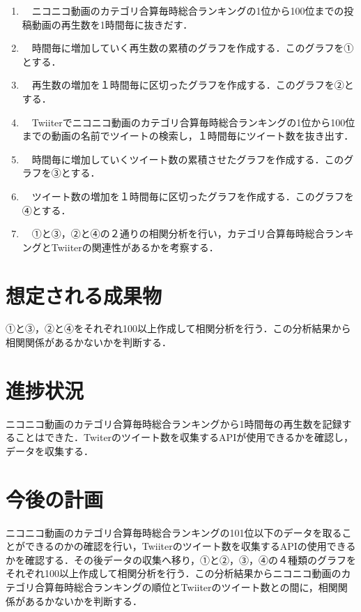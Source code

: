 \documentclass[uplatex,twocolumn,dvipdfmx]{jsarticle}
\begin{document}
\begin{enumerate}

\item　ニコニコ動画のカテゴリ合算毎時総合ランキングの1位から100位までの投稿動画の再生数を1時間毎に抜きだす．
\item　時間毎に増加していく再生数の累積のグラフを作成する．このグラフを①とする．
\item　再生数の増加を１時間毎に区切ったグラフを作成する．このグラフを②とする．
\item　Twiiterでニコニコ動画のカテゴリ合算毎時総合ランキングの1位から100位までの動画の名前でツイートの検索し，１時間毎にツイート数を抜き出す．
\item　時間毎に増加していくツイート数の累積させたグラフを作成する．このグラフを③とする．
\item　ツイート数の増加を１時間毎に区切ったグラフを作成する．このグラフを④とする．
\item　①と③，②と④の２通りの相関分析を行い，カテゴリ合算毎時総合ランキングとTwiiterの関連性があるかを考察する．

\end{enumerate}

\section{想定される成果物}
①と③，②と④をそれぞれ100以上作成して相関分析を行う．この分析結果から相関関係があるかないかを判断する．

\section{進捗状況}
ニコニコ動画のカテゴリ合算毎時総合ランキングから1時間毎の再生数を記録することはできた．Twiterのツイート数を収集するAPIが使用できるかを確認し，データを収集する．

\section{今後の計画}
ニコニコ動画のカテゴリ合算毎時総合ランキングの101位以下のデータを取ることができるのかの確認を行い，Twiiterのツイート数を収集するAPIの使用できるかを確認する．その後データの収集へ移り，①と②，③，④の４種類のグラフをそれぞれ100以上作成して相関分析を行う．この分析結果からニコニコ動画のカテゴリ合算毎時総合ランキングの順位とTwiiterのツイート数との間に，相関関係があるかないかを判断する．



\end{document}
